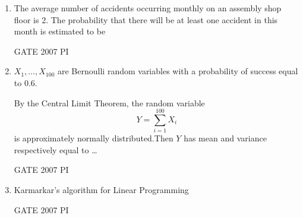 \documentclass[journal,12pt,onecolumn]{IEEEtran}
\theoremstyle{remark}
\begin{document}
\begin{enumerate}
\item 
The average number of accidents occurring monthly on an assembly shop floor is 2.
The probability that there will be at least one accident in this month is estimated to be

\hfill{GATE 2007 PI}
\begin{enumerate}
\end{enumerate}

\item 
$X_1, \ldots, X_{100}$ are Bernoulli random variables with a probability of success equal to $0.6$.  

By the Central Limit Theorem, the random variable  
\[
Y = \sum_{i=1}^{100} X_i\]
is approximately normally distributed.Then $Y$ has mean and variance respectively equal to \dots

\hfill{GATE 2007 PI}
\begin{enumerate}
    \end{enumerate}

\item 
Karmarkar's algorithm for Linear Programming

\hfill{GATE 2007 PI}
\begin{enumerate}
\end{enumerate}


\end{enumerate}
\end{document}
